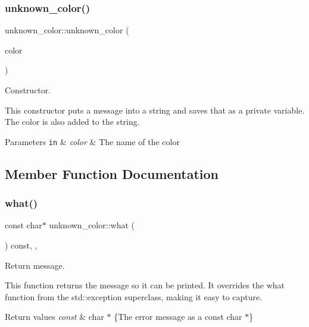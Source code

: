 \subsubsection{\texorpdfstring{unknown\+\_\+color()}{unknown\_color()}}
{\footnotesize\ttfamily unknown\+\_\+color\+::unknown\+\_\+color (\begin{DoxyParamCaption}\item[{const std\+::string}]{color }\end{DoxyParamCaption})\hspace{0.3cm}{\ttfamily [inline]}}



Constructor. 

This constructor puts a message into a string and saves that as a private variable. The color is also added to the string.


\begin{DoxyParams}[1]{Parameters}
\mbox{\tt in}  & {\em color} & The name of the color \\
\hline
\end{DoxyParams}


\subsection{Member Function Documentation}
\mbox{\label{classunknown__color_a3340e3af5b5f734727b73ddf25df3265}} 
\subsubsection{\texorpdfstring{what()}{what()}}
{\footnotesize\ttfamily const char$\ast$ unknown\+\_\+color\+::what (\begin{DoxyParamCaption}{ }\end{DoxyParamCaption}) const\hspace{0.3cm}{\ttfamily [inline]}, {\ttfamily [override]}, {\ttfamily [noexcept]}}



Return message. 

This function returns the message so it can be printed. It overrides the what function from the std\+::exception superclass, making it easy to capture.


\begin{DoxyRetVals}{Return values}
{\em const} & char $\ast$ \{The error message as a const char $\ast$\} \\
\hline
\end{DoxyRetVals}


